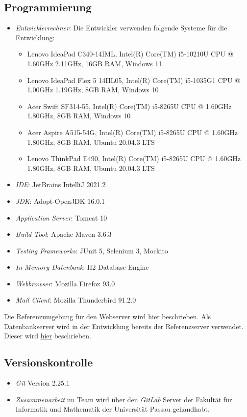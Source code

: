 \subsection{Programmierung}
\begin{itemize}
	\item \emph{Entwicklerrechner}: Die Entwickler verwenden folgende Systeme für die Entwicklung:
		\begin{itemize}
			\item Lenovo IdeaPad C340-14IML, Intel(R) Core(TM) i5-10210U CPU @ 1.60GHz 2.11GHz, 16GB RAM, Windows 11
			\item Lenovo IdeaPad Flex 5 14IIL05, Intel(R) Core(TM) i5-1035G1 CPU @ 1.00GHz 1.19GHz, 8GB RAM, Windows 10
			\item Acer Swift SF314-55, Intel(R) Core(TM) i5-8265U CPU @ 1.60GHz 1.80GHz, 8GB RAM, Windows 10
			\item Acer Aspire A515-54G, Intel(R) Core(TM) i5-8265U CPU @ 1.60GHz 1.80GHz, 8GB RAM, Ubuntu 20.04.3 LTS
			\item Lenovo ThinkPad E490, Intel(R) Core(TM) i5-8265U CPU @ 1.60GHz 1.80GHz, 8GB RAM, Ubuntu 20.04.3 LTS
		\end{itemize}
	\item \emph{IDE}: JetBrains IntelliJ 2021.2
	\item \emph{JDK}: Adopt-OpenJDK 16.0.1
	\item \emph{Application Server}: Tomcat 10
	\item \emph{Build Tool}: Apache Maven 3.6.3
	\item \emph{Testing Frameworks}: JUnit 5, Selenium 3, Mockito
	\item \emph{In-Memory Datenbank}: H2 Database Engine
	\item \emph{Webbrowser}: Mozilla Firefox 93.0
	\item \emph{Mail Client}: Mozilla Thunderbird 91.2.0
\end{itemize}
Die Referenzumgebung für den Webserver wird \hyperref[spezi]{hier} beschrieben.
Als Datenbankserver wird in der Entwicklung bereits der Referenzserver verwendet. Dieser wird \hyperref[dbspezi]{hier} beschrieben.
\subsection{Versionskontrolle}
\begin{itemize}
	\item \emph{Git} Version 2.25.1
	\item \emph{Zusammenarbeit} im Team wird über den \emph{GitLab} Server der Fakultät für Informatik und Mathematik der Universität Passau gehandhabt.
\end{itemize}
